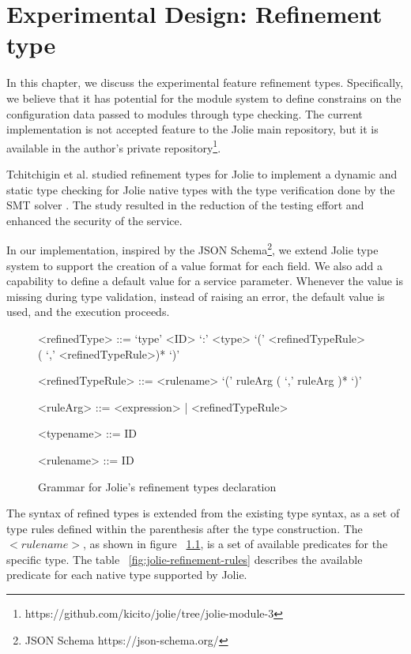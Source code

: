 \chapter{Experimental Design: Refinement type}

In this chapter, we discuss the experimental feature refinement types. Specifically, we believe that it has potential for the module system to define constrains on the configuration data passed to modules through type checking. The current implementation is not accepted feature to the Jolie main repository, but it is available in the author's private repository\footnote{https://github.com/kicito/jolie/tree/jolie-module-3}.

Tchitchigin et al. studied refinement types for Jolie to implement a dynamic and static type checking for Jolie native types with the type verification done by the SMT solver \cite{DBLP:journals/corr/TchitchiginSMEM16}. The study resulted in the reduction of the testing effort and enhanced the security of the service.

In our implementation, inspired by the JSON Schema\footnote{JSON Schema https://json-schema.org/}, we extend Jolie type system to support the creation of a value format for each field. We also add a capability to define a default value for a service parameter. Whenever the value is missing during type validation, instead of raising an error, the default value is used, and the execution proceeds.

\begin{figure}[ht]
    \begin{framed}
        \begin{grammar}
            <refinedType> ::= `type' <ID> `:' <type>  `(' <refinedTypeRule> ( `,' <refinedTypeRule>)* `)'
            
            <refinedTypeRule> ::= <rulename> `(' ruleArg ( `,' ruleArg )* `)'
            
            <ruleArg> ::= <expression> | <refinedTypeRule>
            
            <typename> ::= ID
            
            <rulename> ::= ID
        \end{grammar}
    \end{framed}
    \caption{Grammar for Jolie's refinement types declaration}
    \label{fig:JolieRefinementGrammar}
\end{figure}

The syntax of refined types is extended from the existing type syntax, as a set of type rules defined within the parenthesis after the type construction. The \(<rulename>\), as shown in figure ~\ref{fig:JolieRefinementGrammar}, is a set of available predicates for the specific type. The table ~\ref{fig:jolie-refinement-rules} describes the available predicate for each native type supported by Jolie.

